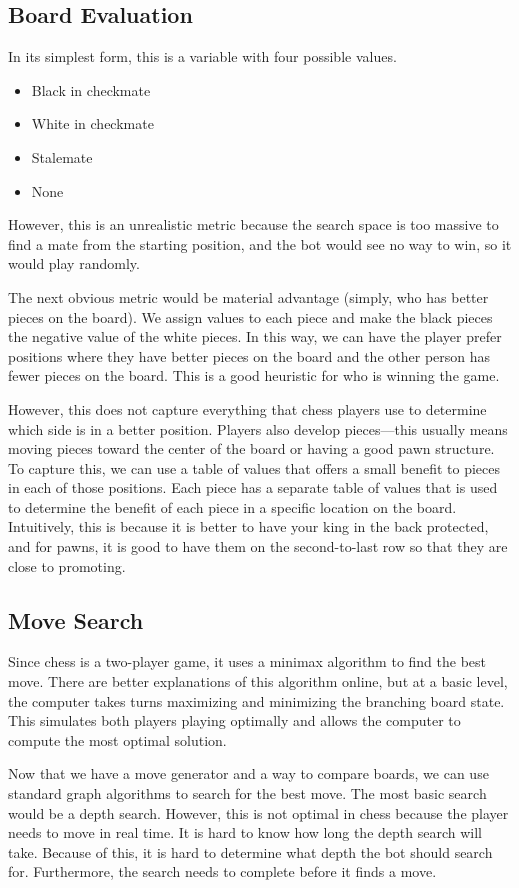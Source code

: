 \documentclass[sigconf]{acmart}
\begin{document}
\subsection{Board Evaluation}
In its simplest form, this is a variable with four possible values.
\begin{itemize}
    \item Black in checkmate
    \item White in checkmate
    \item Stalemate
    \item None
\end{itemize}
However, this is an unrealistic metric because the search space is too massive to find a mate from the starting position, and the bot would see no way to win, so it would play randomly.

The next obvious metric would be material advantage (simply, who has better pieces on the board).
We assign values to each piece and make the black pieces the negative value of the white pieces.
In this way, we can have the player prefer positions where they have better pieces on the board and the other person has fewer pieces on the board. This is a good heuristic for who is winning the game.

However, this does not capture everything that chess players use to determine which side is in a better position.
Players also develop pieces—this usually means moving pieces toward the center of the board or having a good pawn structure.
To capture this, we can use a table of values that offers a small benefit to pieces in each of those positions.
Each piece has a separate table of values that is used to determine the benefit of each piece in a specific location on the board.
Intuitively, this is because it is better to have your king in the back protected, and for pawns, it is good to have them on the second-to-last row so that they are close to promoting.

\subsection{Move Search}
Since chess is a two-player game, it uses a minimax algorithm to find the best move.
There are better explanations of this algorithm online, but at a basic level, the computer takes turns maximizing and minimizing the branching board state. This simulates both players playing optimally and allows the computer to compute the most optimal solution.

Now that we have a move generator and a way to compare boards, we can use standard graph algorithms to search for the best move.
The most basic search would be a depth search.
However, this is not optimal in chess because the player needs to move in real time.
It is hard to know how long the depth search will take.
Because of this, it is hard to determine what depth the bot should search for.
Furthermore, the search needs to complete before it finds a move.
\end{document}
